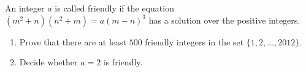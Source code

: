An integer $a$ is called friendly if the equation $(m^2+n)(n^2+m)=a(m-n)^3$ has a solution over the positive integers.

\begin{enumerate}[label = (\alph*)]
	\item  Prove that there are at least $500$ friendly integers in the set $\{ 1,2,\ldots ,2012\}$.

	\item  Decide whether $a=2$ is friendly.
 \end{enumerate}
